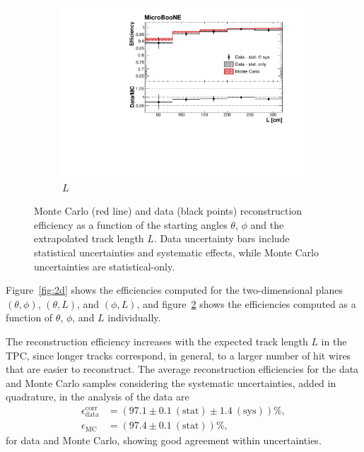 \documentclass[a4paper,11pt]{article}
\begin{document}
\begin{figure}[htbp]
\begin{center}
\begin{subfigure}{0.61\textwidth}
      \includegraphics[width=\linewidth]{figures/l.pdf}
      \caption{$L$} \label{fig:l}
    \end{subfigure}
    \caption{Monte Carlo (red line) and data (black points) reconstruction efficiency as a function of the starting angles $\theta$, $\phi$ and the extrapolated track length $L$. Data uncertainty bars include statistical uncertainties and systematic effects, while Monte Carlo uncertainties are statistical-only.}\label{fig:1d}
  \end{center}
\end{figure}

Figure~\ref{fig:2d} shows the efficiencies computed for the two-dimensional planes $(\theta,\phi)$, $(\theta,L)$, and $(\phi,L)$, and figure~\ref{fig:1d} shows the efficiencies computed as a function of $\theta$, $\phi$, and $L$ individually.

The reconstruction efficiency increases with the expected track length $L$ in the TPC, since longer tracks correspond, in general, to a larger number of hit wires that are easier to reconstruct.
The average reconstruction efficiencies for the data and Monte Carlo samples considering the systematic uncertainties, added in quadrature, in the analysis of the data are
\begin{align}
\epsilon_{\mathrm{data}}^{\mathrm{corr}} &= (97.1 \pm 0.1~\mathrm{(stat)} \pm 1.4~\mathrm{(sys)})\%,\\
\epsilon_{\mathrm{MC}} &= (97.4 \pm 0.1~\mathrm{(stat)})\%,\nonumber
\end{align} for data and Monte Carlo, showing good agreement within uncertainties.
\end{document}

